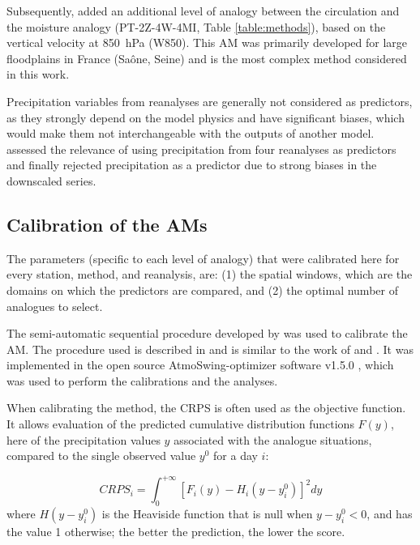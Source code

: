 \documentclass{ametsoc}
\begin{document}
	Subsequently, \citet{BenDaoud2016} added an additional level of analogy between the circulation and the moisture analogy (PT-2Z-4W-4MI, Table \ref{table:methods}), based on the vertical velocity at 850~hPa (W850). This AM was primarily developed for large floodplains in France (Sa\^{o}ne, Seine) and is the most complex method considered in this work. 
	
	Precipitation variables from reanalyses are generally not considered as predictors, as they strongly depend on the model physics \citep{Rienecker2011} and have significant biases, which would make them not interchangeable with the outputs of another model. \citet{Dayon2015} assessed the relevance of using precipitation from four reanalyses as predictors and finally rejected precipitation as a predictor due to strong biases in the downscaled series.
	
	
	\subsection{Calibration of the AMs}
	\label{sec:calibration}
	
	The parameters (specific to each level of analogy) that were calibrated here for every station, method, and reanalysis, are: (1) the spatial windows, which are the domains on which the predictors are compared, and (2) the optimal number of analogues to select.
	
	The semi-automatic sequential procedure developed by \citet{Bontron2004} was used to calibrate the AM. The procedure used is described in \citet{Horton2017c} and is similar to the work of \citet{Radanovics2013} and \citet{BenDaoud2016}. It was implemented in the open source AtmoSwing-optimizer software v1.5.0 \citep[www.atmoswing.org,][]{Horton2017a}, which was used to perform the calibrations and the analyses.
	
	When calibrating the method, the CRPS \citep[Continuous Ranked Probability Score,][]{Brown1974, Matheson1976, Hersbach2000} is often used as the objective function. It allows evaluation of the predicted cumulative distribution functions $F(y)$, here of the precipitation values $y$ associated with the analogue situations, compared to the single observed value $y^{0}$ for a day $i$:
	
	\begin{equation}
	\label{eq:CRPS}
	CRPS_{i} = \int_{0}^{+\infty} \left[ F_{i}(y)-H_{i}(y-y_{i}^{0})\right]^{2} dy
	\end{equation}
	where $H(y-y_{i}^{0})$ is the Heaviside function that is null when $y-y_{i}^{0}<0$, and has the value 1 otherwise; the better the prediction, the lower the score.
	
\end{document}
